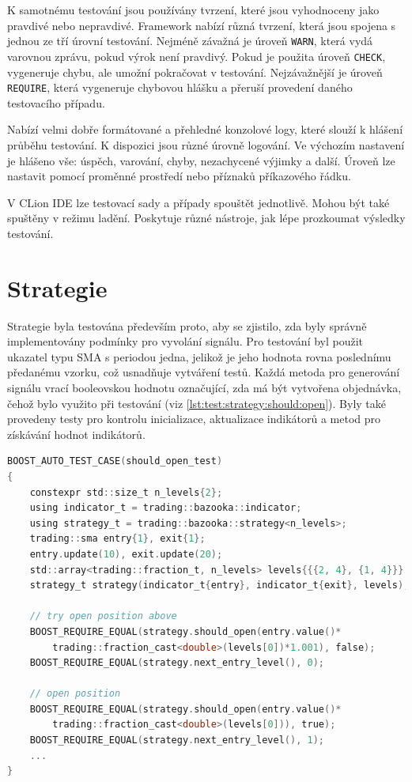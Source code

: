 K samotnému testování jsou používány tvrzení, které jsou vyhodnoceny jako pravdivé nebo nepravdivé.
Framework nabízí různá tvrzení, která jsou spojena s jednou ze tří úrovní testování.
Nejméně závažná je úroveň \texttt{WARN}, která vydá varovnou zprávu, pokud výrok není pravdivý.
Pokud je použita úroveň \texttt{CHECK}, vygeneruje chybu, ale umožní pokračovat v testování.
Nejzávažnější je úroveň \texttt{REQUIRE}, která vygeneruje chybovou hlášku a přeruší provedení daného testovacího případu.

Nabízí velmi dobře formátované a přehledné konzolové logy, které slouží k hlášení průběhu testování.
K dispozici jsou různé úrovně logování.
Ve výchozím nastavení je hlášeno vše: úspěch, varování, chyby, nezachycené výjimky a další.
Úroveň lze nastavit pomocí proměnné prostředí nebo příznaků příkazového řádku.

V CLion IDE lze testovací sady a případy spouštět jednotlivě.
Mohou být také spuštěny v režimu ladění.
Poskytuje různé nástroje, jak lépe prozkoumat výsledky testování.

\section{Strategie}
Strategie byla testována především proto, aby se zjistilo, zda byly správně implementovány podmínky pro vyvolání signálu.
Pro testování byl použit ukazatel typu SMA s periodou jedna, jelikož je jeho hodnota rovna poslednímu předanému vzorku, což usnadňuje vytváření testů.
Každá metoda pro generování signálu vrací booleovskou hodnotu označující, zda má být vytvořena objednávka, čehož bylo využito při testování (viz \ref{lst:test:strategy:should:open}).
Byly také provedeny testy pro kontrolu inicializace, aktualizace indikátorů a metod pro získávání hodnot indikátorů.

\begin{lstlisting}[caption={~Testování podmínek pro signalizaci vytvoření otevírací objednávky},label={lst:test:strategy:should:open},captionpos=t,abovecaptionskip=-\medskipamount,belowcaptionskip=\medskipamount,language=C]
BOOST_AUTO_TEST_CASE(should_open_test)
{
    constexpr std::size_t n_levels{2};
    using indicator_t = trading::bazooka::indicator;
    using strategy_t = trading::bazooka::strategy<n_levels>;
    trading::sma entry{1}, exit{1};
    entry.update(10), exit.update(20);
    std::array<trading::fraction_t, n_levels> levels{{{2, 4}, {1, 4}}};
    strategy_t strategy(indicator_t{entry}, indicator_t{exit}, levels);

    // try open position above
    BOOST_REQUIRE_EQUAL(strategy.should_open(entry.value()*
        trading::fraction_cast<double>(levels[0])*1.001), false);
    BOOST_REQUIRE_EQUAL(strategy.next_entry_level(), 0);

    // open position
    BOOST_REQUIRE_EQUAL(strategy.should_open(entry.value()*
        trading::fraction_cast<double>(levels[0])), true);
    BOOST_REQUIRE_EQUAL(strategy.next_entry_level(), 1);
    ...
}
\end{lstlisting}

